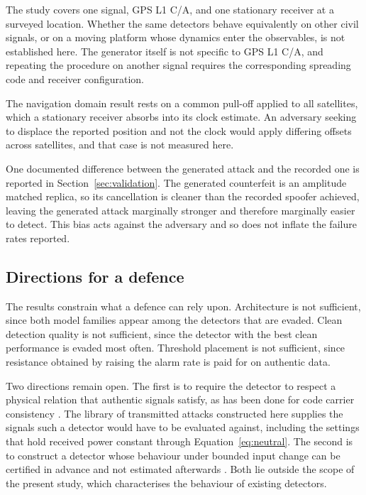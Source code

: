 \documentclass[pdflatex,sn-basic]{sn-jnl}
\theoremstyle{thmstyleone}
\theoremstyle{thmstyletwo}
\theoremstyle{thmstylethree}
\begin{document}
The study covers one signal, GPS L1 C/A, and one stationary receiver at a surveyed
location. Whether the same detectors behave equivalently on other civil signals, or on a
moving platform whose dynamics enter the observables, is not established here. The
generator itself is not specific to GPS L1 C/A, and repeating the procedure on another
signal requires the corresponding spreading code and receiver configuration.

The navigation domain result rests on a common pull-off applied to all satellites, which a
stationary receiver absorbs into its clock estimate. An adversary seeking to displace the
reported position and not the clock would apply differing offsets across satellites,
and that case is not measured here.

One documented difference between the generated attack and the recorded one is reported in
Section~\ref{sec:validation}. The generated counterfeit is an amplitude matched replica, so
its cancellation is cleaner than the recorded spoofer achieved, leaving the generated
attack marginally stronger and therefore marginally easier to detect. This bias acts
against the adversary and so does not inflate the failure rates reported.

\subsection{Directions for a defence}

The results constrain what a defence can rely upon. Architecture is not sufficient, since
both model families appear among the detectors that are evaded. Clean detection quality is
not sufficient, since the detector with the best clean performance is evaded most often.
Threshold placement is not sufficient, since resistance obtained by raising the alarm rate
is paid for on authentic data.

Two directions remain open. The first is to require the detector to respect a physical
relation that authentic signals satisfy, as has been done for code carrier consistency
\citep{song2026generalized}. The library of transmitted attacks constructed here supplies
the signals such a detector would have to be evaluated against, including the settings
that hold received power constant through Equation~\ref{eq:neutral}. The second is
to construct a detector whose behaviour under bounded input change can be certified in
advance and not estimated afterwards \citep{cohen2019certified}. Both lie outside
the scope of the present study, which characterises the behaviour of existing detectors.
\end{document}
